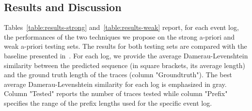 
\subsection{Results and Discussion}
\label{ssec:results}

Tables~\ref{table:results-strong} and~\ref{table:results-weak} report, for each event log, the performances of the two techniques we propose on the strong a-priori and weak a-priori testing sets. The results for both testing sets are compared with the baseline presented in~\cite{niek96732}. For each log, we provide the average Damerau-Levenshtein similarity between the predicted sequence (in square brackets, its average length) and the ground truth length of the traces (column "Groundtruth"). The best average Damerau-Levenshtein similarity for each log is emphasized in gray. Column "Tested" reports the number of traces tested while column "Prefix" specifies the range of the prefix lengths used for the specific event log. %

\newcommand{\maxf}[1]{{\cellcolor[gray]{0.8}} #1}

